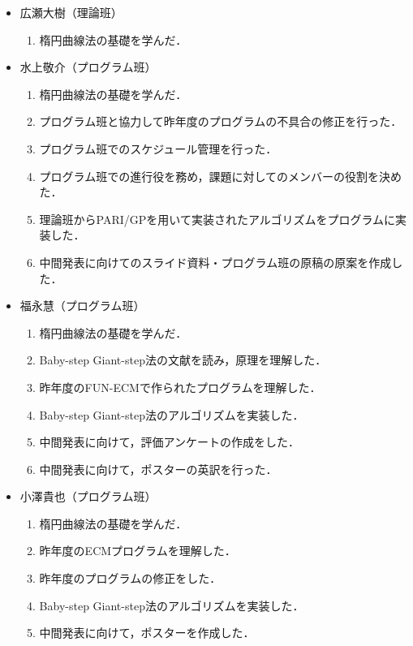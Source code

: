 \documentclass[openany,11pt,papersize]{jsbook}
\begin{document}
\begin{itemize}
\item 広瀬大樹（理論班）
 \begin{enumerate}
 \renewcommand{\labelenumi}{(\arabic{enumi})}
 \item 楕円曲線法の基礎を学んだ．
 \end{enumerate}
 
\item 水上敬介（プログラム班）
 \begin{enumerate}
 \renewcommand{\labelenumi}{(\arabic{enumi})}
 \item 楕円曲線法の基礎を学んだ．
 \item プログラム班と協力して昨年度のプログラムの不具合の修正を行った．
 \item プログラム班でのスケジュール管理を行った．
 \item プログラム班での進行役を務め，課題に対してのメンバーの役割を決めた．
 \item 理論班からPARI/GPを用いて実装されたアルゴリズムをプログラムに実装した．
 \item 中間発表に向けてのスライド資料・プログラム班の原稿の原案を作成した．
 \end{enumerate}
 
\item 福永慧（プログラム班）
 \begin{enumerate}
 \renewcommand{\labelenumi}{(\arabic{enumi})}
 \item 楕円曲線法の基礎を学んだ．
 \item Baby-step Giant-step法の文献を読み，原理を理解した．
 \item 昨年度のFUN-ECMで作られたプログラムを理解した．
 \item Baby-step Giant-step法のアルゴリズムを実装した．
 \item 中間発表に向けて，評価アンケートの作成をした．
 \item 中間発表に向けて，ポスターの英訳を行った．
 \end{enumerate}
 
\item 小澤貴也（プログラム班）
 \begin{enumerate}
 \renewcommand{\labelenumi}{(\arabic{enumi})}
 \item 楕円曲線法の基礎を学んだ．
 \item 昨年度のECMプログラムを理解した．
 \item 昨年度のプログラムの修正をした．
 \item Baby-step Giant-step法のアルゴリズムを実装した．
 \item 中間発表に向けて，ポスターを作成した．
 \end{enumerate}
 

\end{itemize}
\end{document}
